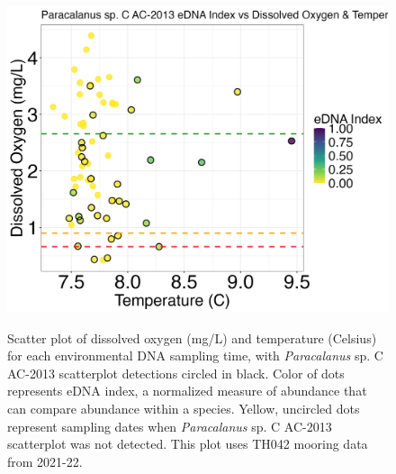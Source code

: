 \documentclass[12pt,twoside]{reedthesis}
\begin{document}
		\begin{figure}[!h]
		\begin{center}
			\includegraphics[scale=0.3]{Paracalanus_Scatter_noOut} \\
			\caption[\textit{Paracalanus} sp. C AC-2013 scatterplot]{\footnotesize{Scatter plot of dissolved oxygen (mg/L) and temperature (Celsius) for each environmental DNA sampling time, with \textit{Paracalanus} sp. C AC-2013 scatterplot detections circled in black. Color of dots represents eDNA index, a normalized measure of abundance that can compare abundance within a species. Yellow, uncircled dots represent sampling dates when \textit{Paracalanus} sp. C AC-2013 scatterplot was not detected. This plot uses TH042 mooring data from 2021-22.}} %
		\end{center}
		\label{ParacalanusScatterApp}
	\end{figure} 
	
\end{document}
